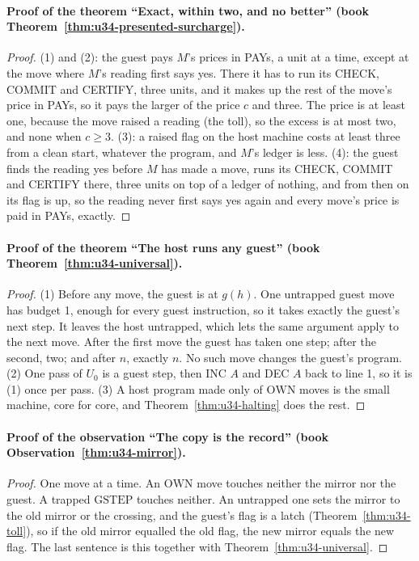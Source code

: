 \documentclass[11pt,twoside]{article}
\theoremstyle{thielethm}
\theoremstyle{thieledef}
\theoremstyle{thieledef}
\theoremstyle{thieledef}
\theoremstyle{thielethm}
\theoremstyle{thieleobs}
\theoremstyle{thielethm}
\begin{document}
\paragraph{Proof of the theorem ``Exact, within two, and no better'' (book Theorem~\ref{thm:u34-presented-surcharge}).}
\begin{proof}
(1) and (2): the guest pays $M$'s prices in PAYs, a unit at a time, except at the move where
$M$'s reading first says yes. There it has to run its CHECK, COMMIT and CERTIFY, three units, and
it makes up the rest of the move's price in PAYs, so it pays the larger of the price $c$ and
three. The price is at least one, because the move raised a reading (the toll), so the excess is
at most two, and none when $c \ge 3$.
(3): a raised flag on the host machine costs at least three from a clean start, whatever the
program, and $M$'s ledger is less.
(4): the guest finds the reading yes before $M$ has made a move, runs its CHECK, COMMIT and
CERTIFY there, three units on top of a ledger of nothing, and from then on its flag is up, so the
reading never first says yes again and every move's price is paid in PAYs, exactly.
\end{proof}

\paragraph{Proof of the theorem ``The host runs any guest'' (book Theorem~\ref{thm:u34-universal}).}
\begin{proof}
(1) Before any move, the guest is at $g(h)$. One untrapped guest move
has budget 1, enough for every guest instruction, so it takes exactly the
guest's next step. It leaves the host untrapped, which lets the same argument
apply to the next move. After the first move the guest has taken one step;
after the second, two; and after $n$, exactly $n$. No such move changes the
guest's program. (2) One pass of $U_0$ is a guest step, then
INC $A$ and DEC $A$ back to line 1, so it is (1) once per pass. (3) A host program made only
of $\mathrm{OWN}$ moves is the small machine, core for core, and
Theorem~\ref{thm:u34-halting} does the rest.
\end{proof}

\paragraph{Proof of the observation ``The copy is the record'' (book Observation~\ref{thm:u34-mirror}).}
\begin{proof}
One move at a time. An $\mathrm{OWN}$ move touches neither the mirror nor the guest. A trapped
$\mathrm{GSTEP}$ touches neither. An untrapped one sets the mirror to the old mirror or the
crossing, and the guest's flag is a latch (Theorem~\ref{thm:u34-toll}), so if the old mirror
equalled the old flag, the new mirror equals the new flag. The last sentence is this
together with Theorem~\ref{thm:u34-universal}.
\end{proof}
\end{document}
